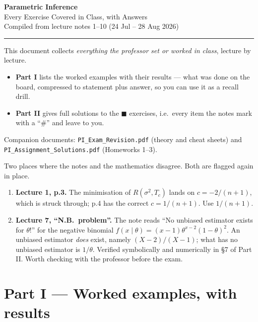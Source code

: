 \documentclass[11pt]{article}
\begin{document}
\begin{center}
{\LARGE\bfseries Parametric Inference}\\[3pt]
{\large Every Exercise Covered in Class, with Answers}\\[5pt]
{\small Compiled from lecture notes 1--10 (24 Jul -- 28 Aug 2026)}
\end{center}

\vspace{4pt}\hrule\vspace{10pt}

\noindent
This document collects \emph{everything the professor set or worked in class}, lecture by lecture.

\begin{itemize}
\item \textbf{Part I} lists the worked examples with their results --- what was done on the
board, compressed to statement plus answer, so you can use it as a recall drill.
\item \textbf{Part II} gives full solutions to the $\blacksquare$ exercises, i.e.\ every item
the notes mark with a ``\#'' and leave to you.
\end{itemize}

\noindent
Companion documents: \texttt{PI\_Exam\_Revision.pdf} (theory and cheat sheets) and
\texttt{PI\_Assignment\_Solutions.pdf} (Homeworks 1--3).

\vspace{6pt}
\begin{flagbox}
Two places where the notes and the mathematics disagree. Both are flagged again in place.
\begin{enumerate}[label=(\roman*)]
\item \textbf{Lecture 1, p.3.} The minimisation of $R(\sigma^2,T_c)$ lands on
$c=-2/(n+1)$, which is struck through; p.4 has the correct $c=1/(n+1)$. Use $1/(n+1)$.
\item \textbf{Lecture 7, ``N.B.\ problem''.} The note reads ``No unbiased estimator exists
for $\theta$!'' for the negative binomial $f(x\mid\theta)=(x-1)\theta^{x-2}(1-\theta)^2$.
An unbiased estimator \emph{does} exist, namely $(X-2)/(X-1)$; what has no unbiased
estimator is $1/\theta$. Verified symbolically and numerically in \S7 of Part II. Worth
checking with the professor before the exam.
\end{enumerate}
\end{flagbox}

\newpage
\tableofcontents
\newpage

\part*{Part I --- Worked examples, with results}
\end{document}
